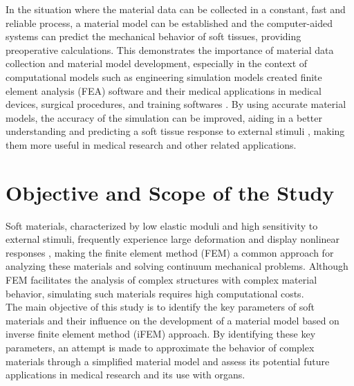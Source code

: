 
In the situation where the material data can be collected in a constant, fast and reliable
process, a material model can be established and the computer-aided systems can predict 
the mechanical behavior of soft tissues, providing preoperative calculations. 
This demonstrates the importance of material data collection and material model development, 
especially in the context of computational models such as engineering simulation models created finite 
element analysis (FEA) software and their medical applications in medical devices, surgical 
procedures, and training softwares \cite{Carter2001}. By using accurate material models, the accuracy of the simulation 
can be improved, aiding in a better understanding and predicting a soft tissue response 
to external stimuli \cite{Zhang2014}, making them more useful in medical research and other related applications.\\

\section{Objective and Scope of the Study} 

Soft materials, characterized by low elastic moduli and high sensitivity to external stimuli,
frequently experience large deformation and display nonlinear responses \cite{Zhang2014}, making 
the finite element method (FEM) a common approach for analyzing these materials and solving continuum mechanical problems. 
Although FEM facilitates the analysis of complex structures with complex material 
behavior, simulating such materials requires high computational costs.\\

The main objective of this study is to identify the key parameters of soft materials and their 
influence on the development of a material model based on inverse finite element method (iFEM) approach. 
By identifying these key parameters, an attempt is made to approximate the behavior of 
complex materials through a simplified material model and
assess its potential future applications in medical research and its use with organs.\\

